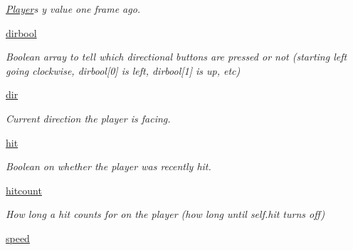 \begin{DoxyCompactItemize}
\begin{DoxyCompactList}\small\item\em \hyperlink{classactor_1_1player_1_1_player}{Player}\textquotesingle{}s y value one frame ago. \end{DoxyCompactList}\item 
\mbox{\label{classactor_1_1player_1_1_player_aae66aa3ba8ee37f20c3f24278c203f5b}} 
\hyperlink{classactor_1_1player_1_1_player_aae66aa3ba8ee37f20c3f24278c203f5b}{dirbool}
\begin{DoxyCompactList}\small\item\em Boolean array to tell which directional buttons are pressed or not (starting left going clockwise, dirbool\mbox{[}0\mbox{]} is left, dirbool\mbox{[}1\mbox{]} is up, etc) \end{DoxyCompactList}\item 
\hyperlink{classactor_1_1player_1_1_player_a569ec214c309ddbf82e414c310861832}{dir}
\begin{DoxyCompactList}\small\item\em Current direction the player is facing. \end{DoxyCompactList}\item 
\mbox{\label{classactor_1_1player_1_1_player_a80a7403771d9fb980354b43241eb21d2}} 
\hyperlink{classactor_1_1player_1_1_player_a80a7403771d9fb980354b43241eb21d2}{hit}
\begin{DoxyCompactList}\small\item\em Boolean on whether the player was recently hit. \end{DoxyCompactList}\item 
\mbox{\label{classactor_1_1player_1_1_player_a0c6434fb932d898b1ec1ed77c97d46b5}} 
\hyperlink{classactor_1_1player_1_1_player_a0c6434fb932d898b1ec1ed77c97d46b5}{hitcount}
\begin{DoxyCompactList}\small\item\em How long a hit counts for on the player (how long until self.\+hit turns off) \end{DoxyCompactList}\item 
\mbox{\label{classactor_1_1player_1_1_player_a303bd9cebacff3d0c25b359e18d7bb3a}} 
\hyperlink{classactor_1_1player_1_1_player_a303bd9cebacff3d0c25b359e18d7bb3a}{speed}

\end{DoxyCompactItemize}
